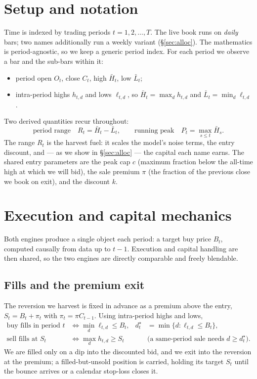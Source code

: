 \documentclass[11pt]{article}
\begin{document}
\tableofcontents
\newpage

\section{Setup and notation}

Time is indexed by trading periods $t=1,2,\dots,T$. The live book runs on \emph{daily} bars; two
names additionally run a weekly variant (\S\ref{sec:alloc}). The mathematics is period-agnostic,
so we keep a generic period index. For each period we observe a bar and the sub-bars within it:
\begin{itemize}[topsep=2pt,itemsep=1pt]
\item period open $O_t$, close $C_t$, high $\bar H_t$, low $\bar L_t$;
\item intra-period highs $h_{t,d}$ and lows $\ell_{t,d}$, so $\bar H_t=\max_d h_{t,d}$ and
      $\bar L_t=\min_d \ell_{t,d}$.
\end{itemize}
Two derived quantities recur throughout:
\begin{equation}
\text{period range}\quad R_t=\bar H_t-\bar L_t,\qquad
\text{running peak}\quad P_t=\max_{s\le t}\bar H_s .
\end{equation}
The range $R_t$ is the harvest fuel: it scales the model's noise terms, the entry discount, and
--- as we show in \S\ref{sec:alloc} --- the capital each name earns. The shared entry parameters
are the peak cap $c$ (maximum fraction below the all-time high at which we will bid), the sale
premium $\pi$ (the fraction of the previous close we book on exit), and the discount $k$.

\section{Execution and capital mechanics}

Both engines produce a single object each period: a target buy price $B_t$, computed causally
from data up to $t-1$. Execution and capital handling are then shared, so the two engines are
directly comparable and freely blendable.

\subsection{Fills and the premium exit}
The reversion we harvest is fixed in advance as a premium above the entry, $S_t=B_t+\pi_t$ with
$\pi_t=\pi C_{t-1}$. Using intra-period highs and lows,
\begin{align}
\text{buy fills in period }t &\iff \min_d \ell_{t,d}\le B_t,
  & d_t^{\star}&=\min\{d:\ell_{t,d}\le B_t\},\\
\text{sell fills at }S_t &\iff \max_d h_{t,d}\ge S_t
  &&\text{(a same-period sale needs } d\ge d_t^{\star}).
\end{align}
We are filled only on a dip into the discounted bid, and we exit into the reversion at the
premium; a filled-but-unsold position is carried, holding its target $S_t$ until the bounce
arrives or a calendar stop-loss closes it.
\end{document}
